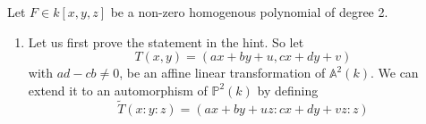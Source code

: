 \begin{exercise}{2}
    Let $F \in k[x, y, z]$ be a non-zero homogenous polynomial of degree 2.
    \begin{enumerate}
        \item{} Let us first prove the statement in the hint. So let
            \begin{equation*}
                T (x, y) = (a x + b y + u, c x + d y + v)
            \end{equation*}
            with $ad - cb \not= 0$, be an affine linear transformation of
            $\mathbb{A}^2(k)$.
            We can extend it to an automorphism of $\mathbb{P}^2(k)$ by defining
            \begin{equation*}
                \widetilde{T} (x : y : z) = (a x + b y + u z : c x + d y + v z : z)

\end{equation*}
\end{enumerate}
\end{exercise}
